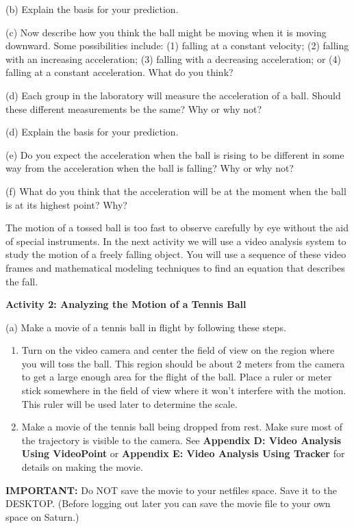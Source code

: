 (b) Explain the basis for your prediction.
\vspace{20mm}

(c) Now describe how you think the ball might be moving when it is moving downward. Some possibilities include: (1) falling at a constant velocity; (2) falling
with an increasing acceleration; (3) falling with a decreasing acceleration;
or (4) falling at a constant acceleration. What do you think?
\vspace{20mm}

(d) Each group in the laboratory will measure the acceleration of a ball. Should these different measurements be the same? Why or why not?
\vspace{20mm}

(d) Explain the basis for your prediction.
\vspace{20mm}

(e) Do you expect the acceleration when the ball is rising to be different in
some way from the acceleration when the ball is falling? Why or why not?
\vspace{20mm}

(f) What do you think that the acceleration will be at the moment when the ball
is at its highest point? Why?
\vspace{20mm}

The motion of a tossed ball is too fast to observe carefully by eye without
the aid of special instruments. In the next activity we will use a video analysis system to study the motion of a freely falling object. You will use a sequence of these video frames and mathematical modeling techniques to find an equation that describes the fall. 

\textbf{Activity 2: Analyzing the Motion of a Tennis Ball} 

(a) Make a movie of a tennis ball in flight by following these steps.

\begin{enumerate}
\item Turn on the video camera and center the field of view on the region where you will toss the ball. This region should be about 2 meters from the camera to
get a large enough area for the flight of the ball. Place a ruler or meter stick somewhere in the field of view where it won't interfere with the motion. This
ruler will be used later to determine the scale. 
\item Make a movie of the tennis ball being dropped from rest. Make sure most of the trajectory is visible to the camera. See \textbf{Appendix D: Video Analysis Using VideoPoint} or \textbf{Appendix E: Video Analysis Using Tracker} for details on making the movie.
\end{enumerate}
\textbf{IMPORTANT:} Do NOT save the movie to your netfiles space.  Save it to the DESKTOP.  (Before logging out later you can save the movie file to your own space on Saturn.)
\vspace{5mm}

